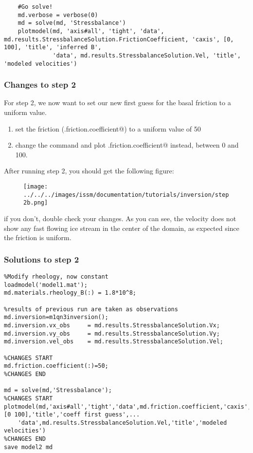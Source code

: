 \begin{verbatim}
    #Go solve!
    md.verbose = verbose(0)
    md = solve(md, 'Stressbalance')
    plotmodel(md, 'axis#all', 'tight', 'data', md.results.StressbalanceSolution.FrictionCoefficient, 'caxis', [0, 100], 'title', 'inferred B',
              'data', md.results.StressbalanceSolution.Vel, 'title', 'modeled velocities')\end{verbatim}

\subsubsection{Changes to step 2}
For step 2, we now want to set our new first guess for the basal friction to a uniform value.
\begin{enumerate}
	\item set the friction (\verb@md.friction.coefficient@) to a uniform value of 50
	\item change the \verb@plotmodel@ command and plot \verb@md.friction.coefficient@ instead, between 0 and 100.
\end{enumerate}
After running step 2, you should get the following figure:
\begin{figure}[H]
	\begin{center}
		\texttt{[image: ../../../images/issm/documentation/tutorials/inversion/step2b.png]}
	\end{center}
\end{figure}
if you don't, double check your changes. As you can see, the velocity does not show any fast flowing ice stream in the center of the domain, as expected since the friction is uniform.

\subsubsection{Solutions to step 2}
\begin{verbatim}%Modify rheology, now constant
loadmodel('model1.mat');
md.materials.rheology_B(:) = 1.8*10^8;

%results of previous run are taken as observations
md.inversion=m1qn3inversion();
md.inversion.vx_obs		= md.results.StressbalanceSolution.Vx;
md.inversion.vy_obs		= md.results.StressbalanceSolution.Vy;
md.inversion.vel_obs	= md.results.StressbalanceSolution.Vel;

%CHANGES START
md.friction.coefficient(:)=50;
%CHANGES END

md = solve(md,'Stressbalance');
%CHANGES START
plotmodel(md,'axis#all','tight','data',md.friction.coefficient,'caxis',[0 100],'title','coeff first guess',...
	'data',md.results.StressbalanceSolution.Vel,'title','modeled velocities')
%CHANGES END
save model2 md\end{verbatim}

